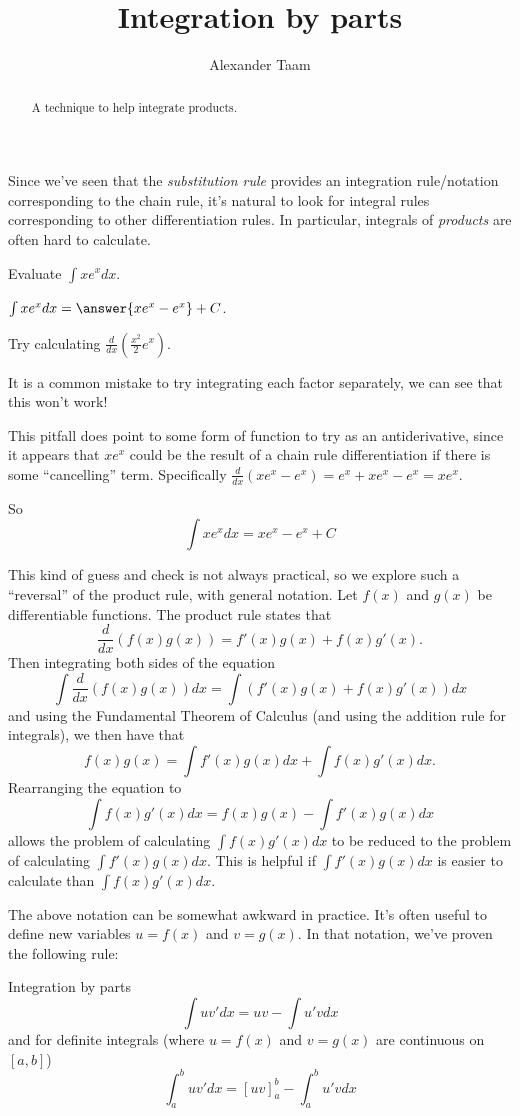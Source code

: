 \documentclass{ximera}
\title{Integration by parts}
\author{Alexander Taam}
\begin{document}
\begin{abstract}
  A technique to help integrate products.
\end{abstract}
\maketitle

Since we've seen that the \emph{substitution rule} provides an integration rule/notation corresponding to the chain rule, it's natural to look for integral rules corresponding to other differentiation rules. In particular, integrals of \emph{products} are often hard to calculate.

\begin{problem}
Evaluate $\int xe^xdx$.

$\int xe^xdx = \answer{xe^x-e^x}+C$.
\begin{hint}
Try calculating $\frac{d}{dx}(\frac{x^2}{2}e^x)$.

It is a common mistake to try integrating each factor separately, we can see that this won't work!
\end{hint}
\begin{feedback}
This pitfall does point to some form of function to try as an antiderivative, since it appears that $xe^x$ could be the result of a chain rule differentiation if there is some ``cancelling'' term. Specifically $\frac{d}{dx}(xe^x-e^x)=e^x+xe^x-e^x=xe^x$. 

So \[\int xe^xdx=xe^x-e^x+C\]
\end{feedback}

\end{problem}


This kind of guess and check is not always practical, so we explore such a ``reversal'' of the product rule, with general notation. Let $f(x)$ and $g(x)$ be differentiable functions. The product rule states that $$\frac{d}{dx}(f(x)g(x))=f'(x)g(x)+f(x)g'(x).$$ Then integrating both sides of the equation
$$\int \frac{d}{dx}(f(x)g(x))dx=\int \left(f'(x)g(x)+f(x)g'(x)\right)dx$$
and using the Fundamental Theorem of Calculus (and using the addition rule for integrals), we then have that 
$$f(x)g(x)=\int f'(x)g(x)dx+\int f(x)g'(x)dx.$$
Rearranging the equation to
$$\int f(x)g'(x)dx=f(x)g(x)-\int f'(x)g(x)dx$$
allows the problem of calculating $\int f(x)g'(x)dx$ to be reduced to the problem of calculating $\int f'(x)g(x)dx$. This is helpful if $\int f'(x)g(x)dx$ is easier to calculate than $\int f(x)g'(x)dx$.

The above notation can be somewhat awkward in practice. It's often useful to define new variables $u=f(x)$ and $v=g(x)$. In that notation, we've proven the following rule:
\begin{theorem}{Integration by parts}\label{int-rule-parts}
$$\int uv'dx=uv-\int u'vdx$$
and for definite integrals (where $u=f(x)$ and $v=g(x)$ are continuous on $[a,b]$)
$$\int_a^b uv'dx=[uv]_a^b-\int_a^b u'vdx$$
\end{theorem}
\end{document}
